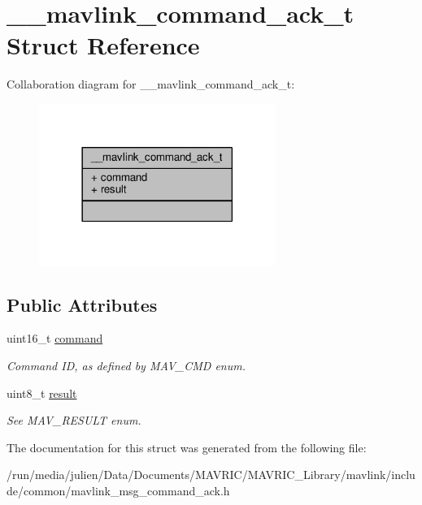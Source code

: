 \hypertarget{struct____mavlink__command__ack__t}{\section{\+\_\+\+\_\+mavlink\+\_\+command\+\_\+ack\+\_\+t Struct Reference}
\label{struct____mavlink__command__ack__t}
}


Collaboration diagram for \+\_\+\+\_\+mavlink\+\_\+command\+\_\+ack\+\_\+t\+:
\nopagebreak
\begin{figure}[H]
\begin{center}
\leavevmode
\includegraphics[width=218pt]{struct____mavlink__command__ack__t__coll__graph}
\end{center}
\end{figure}
\subsection*{Public Attributes}
\begin{DoxyCompactItemize}
\item 
\hypertarget{struct____mavlink__command__ack__t_a4c63e16e7da216bf952f61e33a4ad5e7}{uint16\+\_\+t \hyperlink{struct____mavlink__command__ack__t_a4c63e16e7da216bf952f61e33a4ad5e7}{command}}\label{struct____mavlink__command__ack__t_a4c63e16e7da216bf952f61e33a4ad5e7}

\begin{DoxyCompactList}\small\item\em Command I\+D, as defined by M\+A\+V\+\_\+\+C\+M\+D enum. \end{DoxyCompactList}\item 
\hypertarget{struct____mavlink__command__ack__t_ae8165e8e4f7a1438977e1a7edd646b69}{uint8\+\_\+t \hyperlink{struct____mavlink__command__ack__t_ae8165e8e4f7a1438977e1a7edd646b69}{result}}\label{struct____mavlink__command__ack__t_ae8165e8e4f7a1438977e1a7edd646b69}

\begin{DoxyCompactList}\small\item\em See M\+A\+V\+\_\+\+R\+E\+S\+U\+L\+T enum. \end{DoxyCompactList}\end{DoxyCompactItemize}


The documentation for this struct was generated from the following file\+:\begin{DoxyCompactItemize}
\item 
/run/media/julien/\+Data/\+Documents/\+M\+A\+V\+R\+I\+C/\+M\+A\+V\+R\+I\+C\+\_\+\+Library/mavlink/include/common/mavlink\+\_\+msg\+\_\+command\+\_\+ack.\+h\end{DoxyCompactItemize}
